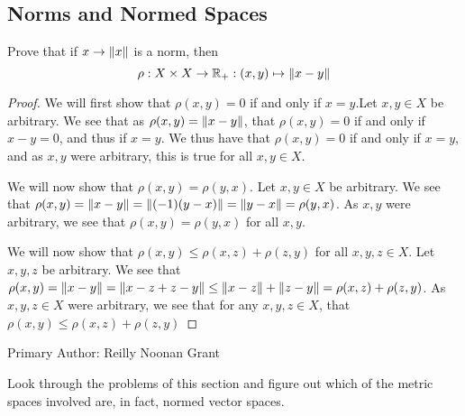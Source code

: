 \subsection{Norms and Normed Spaces}

\begin{minorEx}%
    Prove that if $x \to \Vert x\Vert$ is a norm, then
    \[
        \rho : X \times X \to \mathbb{R}_+ : (x,y) \mapsto \Vert x - y\Vert
    \]
\end{minorEx}

\begin{proof}
  We will first show that $\rho(x,y) =0$ if and only if $x=y$.Let
  $x,y\in X$ be arbitrary.
  We see that as $\rho(x,y)= \Vert x-y\Vert$, that $\rho(x,y)=0$ 
  if and only if $x-y=0$, and thus if $x=y$. We thus have
  that $\rho(x,y) =0$ if and only if $x=y$, and as $x,y$ were
  arbitrary, this is true for all $x,y\in X$.

  We will now show that $\rho(x,y)= \rho(y,x)$. Let $x,y\in X$ be
  arbitrary. We see that $\rho(x,y)
  = \Vert x-y\Vert=\Vert({-1})(y-x)\Vert=\Vert y-x\Vert= \rho(y,x)$. As $x,y$
  were arbitrary, we see that $\rho(x,y)= \rho(y,x)$ for all $x,y$.

  We will now show that $\rho(x,y) \leq \rho(x,z) + \rho(z,y)$ for all
  $x,y,z \in X$. Let $x,y,z$ be arbitrary. We see that 
  $\rho(x,y) = \Vert x-y\Vert =
  \Vert x-z +z -y\Vert \leq \Vert x-z\Vert+\Vert z-y\Vert= \rho(x,z) + \rho(z,y)$.
  As $x,y,z\in X$ were arbitrary, we see that for any $x,y,z\in X$,
  that $\rho(x,y) \leq \rho(x,z) + \rho(z,y)$
\end{proof}

Primary Author: Reilly Noonan Grant

\begin{minorEx}%
    Look through the problems of this section and figure out which 
    of the metric spaces involved are, in fact, normed vector spaces.
\end{minorEx}


